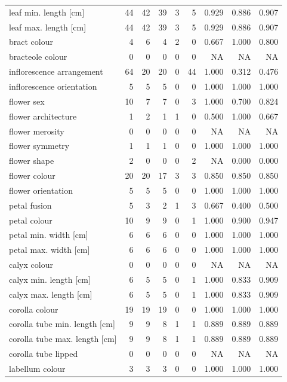 \begin{longtable}{p{}rrrrrrrr}
leaf min. length [cm] & 44 & 42 & 39 & 3 & 5 & 0.929 & 0.886 & 0.907 \\
leaf max. length [cm] & 44 & 42 & 39 & 3 & 5 & 0.929 & 0.886 & 0.907 \\
bract colour & 4 & 6 & 4 & 2 & 0 & 0.667 & 1.000 & 0.800 \\
bracteole colour & 0 & 0 & 0 & 0 & 0 & NA & NA & NA \\
inflorescence arrangement & 64 & 20 & 20 & 0 & 44 & 1.000 & 0.312 & 0.476 \\
inflorescence orientation & 5 & 5 & 5 & 0 & 0 & 1.000 & 1.000 & 1.000 \\
flower sex & 10 & 7 & 7 & 0 & 3 & 1.000 & 0.700 & 0.824 \\
flower architecture & 1 & 2 & 1 & 1 & 0 & 0.500 & 1.000 & 0.667 \\
flower merosity & 0 & 0 & 0 & 0 & 0 & NA & NA & NA \\
flower symmetry & 1 & 1 & 1 & 0 & 0 & 1.000 & 1.000 & 1.000 \\
flower shape & 2 & 0 & 0 & 0 & 2 & NA & 0.000 & 0.000 \\
flower colour & 20 & 20 & 17 & 3 & 3 & 0.850 & 0.850 & 0.850 \\
flower orientation & 5 & 5 & 5 & 0 & 0 & 1.000 & 1.000 & 1.000 \\
petal fusion & 5 & 3 & 2 & 1 & 3 & 0.667 & 0.400 & 0.500 \\
petal colour & 10 & 9 & 9 & 0 & 1 & 1.000 & 0.900 & 0.947 \\
petal min. width [cm] & 6 & 6 & 6 & 0 & 0 & 1.000 & 1.000 & 1.000 \\
petal max. width [cm] & 6 & 6 & 6 & 0 & 0 & 1.000 & 1.000 & 1.000 \\
calyx colour & 0 & 0 & 0 & 0 & 0 & NA & NA & NA \\
calyx min. length [cm] & 6 & 5 & 5 & 0 & 1 & 1.000 & 0.833 & 0.909 \\
calyx max. length [cm] & 6 & 5 & 5 & 0 & 1 & 1.000 & 0.833 & 0.909 \\
corolla colour & 19 & 19 & 19 & 0 & 0 & 1.000 & 1.000 & 1.000 \\
corolla tube min. length [cm] & 9 & 9 & 8 & 1 & 1 & 0.889 & 0.889 & 0.889 \\
corolla tube max. length [cm] & 9 & 9 & 8 & 1 & 1 & 0.889 & 0.889 & 0.889 \\
corolla tube lipped & 0 & 0 & 0 & 0 & 0 & NA & NA & NA \\
labellum colour & 3 & 3 & 3 & 0 & 0 & 1.000 & 1.000 & 1.000 \\

\end{longtable}
